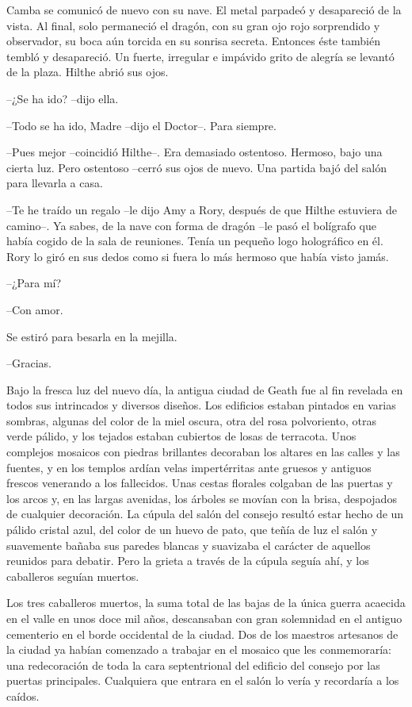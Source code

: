 {Camba se comunicó de nuevo con su nave. El metal parpadeó y desapareció
	de la vista. Al final, solo permaneció el dragón, con su gran ojo rojo
	sorprendido y observador, su boca aún torcida en su sonrisa secreta.
	Entonces éste también tembló y desapareció. Un fuerte, irregular e
	impávido grito de alegría se levantó de la plaza. Hilthe abrió sus
ojos.}

{--¿Se ha ido? --dijo ella.}

{--Todo se ha ido, Madre --dijo el Doctor--. Para siempre.}

{--Pues mejor --coincidió Hilthe--. Era demasiado ostentoso. Hermoso,
	bajo una cierta luz. Pero ostentoso --cerró sus ojos de nuevo. Una
partida bajó del salón para llevarla a casa.}

{--Te he traído un regalo --le dijo Amy a Rory, después de que Hilthe
	estuviera de camino--. Ya sabes, de la nave con forma de dragón --le
	pasó el bolígrafo que había cogido de la sala de reuniones. Tenía un
	pequeño logo holográfico en él. Rory lo giró en sus dedos como si fuera
lo más hermoso que había visto jamás.}

{--¿Para mí?}

{--Con amor.}

{Se estiró para besarla en la mejilla.}

{--Gracias.}

{Bajo la fresca luz del nuevo día, la antigua ciudad de Geath fue al fin
	revelada en todos sus intrincados y diversos diseños. Los edificios
	estaban pintados en varias sombras, algunas del color de la miel oscura,
	otra del rosa polvoriento, otras verde pálido, y los tejados estaban
	cubiertos de losas de terracota. Unos complejos mosaicos con piedras
	brillantes decoraban los altares en las calles y las fuentes, y en los
	templos ardían velas impertérritas ante gruesos y antiguos frescos
	venerando a los fallecidos. Unas cestas florales colgaban de las puertas
	y los arcos y, en las largas avenidas, los árboles se movían con la
	brisa, despojados de cualquier decoración. La cúpula del salón del
	consejo resultó estar hecho de un pálido cristal azul, del color de un
	huevo de pato, que teñía de luz el salón y suavemente bañaba sus paredes
	blancas y suavizaba el carácter de aquellos reunidos para debatir. Pero
	la grieta a través de la cúpula seguía ahí, y los caballeros seguían
muertos.}

{Los tres caballeros muertos, la suma total de las bajas de la única
	guerra acaecida en el valle en unos doce mil años, descansaban con gran
	solemnidad en el antiguo cementerio en el borde occidental de la ciudad.
	Dos de los maestros artesanos de la ciudad ya habían comenzado a
	trabajar en el mosaico que les conmemoraría: una redecoración de toda la
	cara septentrional del edificio del consejo por las puertas principales.
Cualquiera que entrara en el salón lo vería y recordaría a los caídos.}

